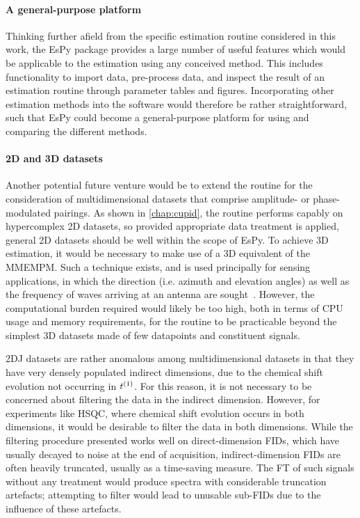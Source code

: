 \paragraph{A general-purpose platform}
Thinking further afield from the specific estimation routine considered in this
work, the \ac{EsPy} package provides a large number of useful features which
would be applicable to the estimation using any conceived method. This includes
functionality to import data, pre-process data, and inspect the result of an
estimation routine through parameter tables and figures.
Incorporating other estimation methods into the software would therefore be
rather straightforward, such that \ac{EsPy} could become a general-purpose
platform for using and comparing the different methods.

\paragraph{\ac{2D} and \ac{3D} datasets}
Another potential future venture would be to extend the routine for the
consideration of multidimensional datasets that comprise amplitude- or
phase-modulated pairings.
As shown in \cref{chap:cupid}, the routine performs capably on
hypercomplex \ac{2D} datasets, so provided appropriate data treatment is
applied, general \ac{2D} datasets should be well within the scope of
\ac{EsPy}.
To achieve \ac{3D} estimation, it would be necessary to
make use of a \ac{3D} equivalent of the \ac{MMEMPM}. Such a technique exists,
and is used principally for sensing applications, in which the direction (i.e.
azimuth and elevation angles) as well as the frequency of waves arriving at an
antenna are sought~\cite{Yilmazer2006}.
However, the computational burden required would likely be too high, both
in terms of \ac{CPU} usage and memory requirements, for the routine to be
practicable beyond the simplest \ac{3D} datasets made of few datapoints and
constituent signals.

\ac{2DJ} datasets are rather anomalous among multidimensional datasets in
that they have very densely populated indirect dimensions, due to the chemical
shift evolution not occurring in $t^{(1)}$. For this reason, it
is not necessary to be concerned about filtering the data in the indirect
dimension. However, for experiments like \ac{HSQC}, where chemical shift
evolution occurs in both dimensions, it would be desirable to filter
the data in both dimensions.
While the filtering procedure presented works well on direct-dimension
\acp{FID}, which have usually decayed to noise at the end
of acquisition, indirect-dimension \acp{FID} are often heavily truncated,
usually as a time-saving measure. The \ac{FT} of such signals without any
treatment would produce spectra with considerable truncation artefacts;
attempting to filter would lead to unusable sub-\acp{FID} due to the influence
of these artefacts.


